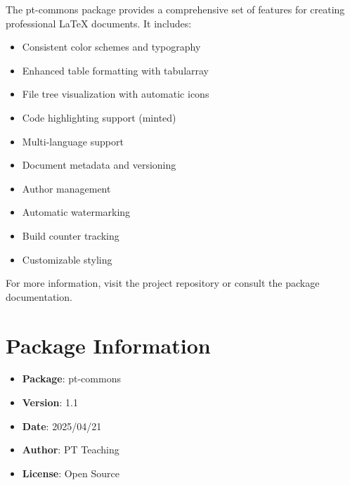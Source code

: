 \documentclass[11pt,letterpaper]{article}
\begin{document}
The pt-commons package provides a comprehensive set of features for creating professional LaTeX documents. It includes:

\begin{itemize}
    \item Consistent color schemes and typography
    \item Enhanced table formatting with tabularray
    \item File tree visualization with automatic icons
    \item Code highlighting support (minted)
    \item Multi-language support
    \item Document metadata and versioning
    \item Author management
    \item Automatic watermarking
    \item Build counter tracking
    \item Customizable styling
\end{itemize}

For more information, visit the project repository or consult the package documentation.

\section*{Package Information}

\begin{itemize}
    \item \textbf{Package}: pt-commons
    \item \textbf{Version}: 1.1
    \item \textbf{Date}: 2025/04/21
    \item \textbf{Author}: PT Teaching
    \item \textbf{License}: Open Source
\end{itemize}
\end{document}
